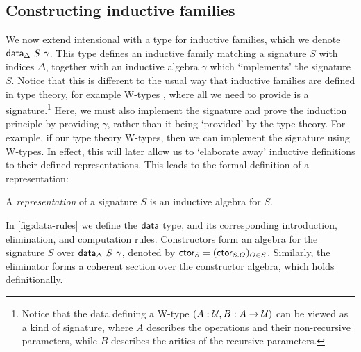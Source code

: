 \subsection{Constructing inductive families}\label{sub:constructing-inductive-families}

We now extend intensional \lambdamltt with a type for inductive families, which we
denote $\textsf{data}_\Delta\ S\ \gamma$. This type defines an inductive family
matching a signature $S$ with indices $\Delta$, together with an inductive
algebra $\gamma$ which `implements' the signature $S$. Notice that this is
different to the usual way that inductive families are defined in type theory,
for example W-types \cite{Abbott2004-va}, where all we need to provide is
a signature.\footnote{
Notice that the data defining a W-type $(A : \mathcal{U}, B : A \to \mathcal{U})$ can be viewed as a kind of signature, where $A$ describes the
operations and their non-recursive parameters, while $B$ describes the arities of the recursive parameters.}
Here, we must also implement the signature and prove
the induction principle by providing $\gamma$, rather than it being `provided' by
the type theory. For example, if our type theory W-types, then we can
implement the signature using W-types. In effect, this will later allow us to
`elaborate away' inductive definitions to their defined representations.
This leads to the formal definition of a representation:
\begin{definition}
A \emph{representation} of a signature $S$ is an inductive algebra for $S$.
\end{definition}

In \cref{fig:data-rules} we define the $\textsf{data}$ type, and its corresponding
introduction, elimination, and computation rules.
Constructors form an algebra for the signature $S$ over
$\textsf{data}_\Delta\ S\ \gamma$, denoted by $\textsf{ctor}_S = (\textsf{ctor}_{S.O})_{O \in S}$.
Similarly, the eliminator forms a coherent section over the constructor algebra,
which holds definitionally.


